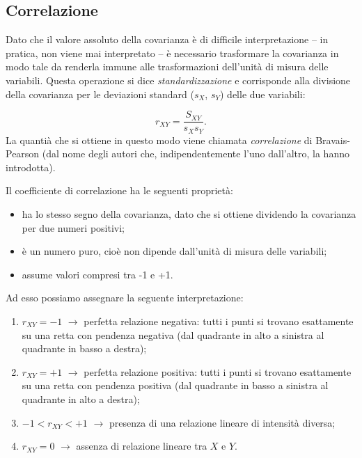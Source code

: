\documentclass[
  10pt,
  italian,
  a4paper,
  extrafontsizes,onecolumn,openright
  ]{memoir}
\providecommand{\tightlist}{%
  \setlength{\itemsep}{0pt}\setlength{\parskip}{0pt}}
\newlength{\rf}
\theoremstyle{definition}
\theoremstyle{definition}
\theoremstyle{definition}
\theoremstyle{definition}
\theoremstyle{remark}
\begin{document}
\hypertarget{correlazione}{%
\subsection{Correlazione}\label{correlazione}}

Dato che il valore assoluto della covarianza è di difficile
interpretazione -- in pratica, non viene mai interpretato -- è
necessario trasformare la covarianza in modo tale da renderla immune
alle trasformazioni dell'unità di misura delle variabili. Questa
operazione si dice \emph{standardizzazione} e corrisponde alla divisione
della covarianza per le deviazioni standard (\(s_X\), \(s_Y\)) delle due
variabili:

\begin{equation}
r_{XY} = \frac{S_{XY}}{s_X s_Y}.
\label{eq:correlation}
\end{equation}
La quantià che si ottiene in questo modo viene chiamata \emph{correlazione} di Bravais-Pearson (dal nome degli autori che, indipendentemente l'uno dall'altro, la hanno introdotta).

Il coefficiente di correlazione ha le seguenti proprietà:

\begin{itemize}
\tightlist
\item
  ha lo stesso segno della covarianza, dato che si ottiene dividendo
  la covarianza per due numeri positivi;
\item
  è un numero puro, cioè non dipende dall'unità di misura delle
  variabili;
\item
  assume valori compresi tra -1 e +1.
\end{itemize}

Ad esso possiamo assegnare la seguente interpretazione:

\begin{enumerate}
\def\labelenumi{\arabic{enumi}.}
\tightlist
\item
  \(r_{XY} = -1\) \(\rightarrow\) perfetta relazione negativa: tutti i
  punti si trovano esattamente su una retta con pendenza negativa (dal
  quadrante in alto a sinistra al quadrante in basso a destra);
\item
  \(r_{XY} = +1\) \(\rightarrow\) perfetta relazione positiva: tutti i
  punti si trovano esattamente su una retta con pendenza positiva (dal
  quadrante in basso a sinistra al quadrante in alto a destra);
\item
  \(-1 < r_{XY} < +1\) \(\rightarrow\) presenza di una relazione lineare
  di intensità diversa;
\item
  \(r_{XY} = 0\) \(\rightarrow\) assenza di relazione lineare tra \(X\) e
  \(Y\).
\end{enumerate}
\end{document}
